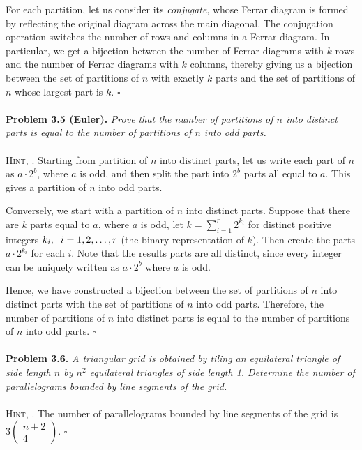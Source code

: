 \documentclass[a4paper,oneside]{article}
\numberwithin{equation}{section}
\begin{document}
For each partition, let us consider its \textit{conjugate}, whose Ferrar diagram is formed by reflecting the original diagram across the main diagonal. The conjugation operation switches the number of rows and columns in a Ferrar diagram. In particular, we get a bijection between the number of Ferrar diagrams with $k$ rows and the number of Ferrar diagrams with $k$ columns, thereby giving us a bijection between the set of partitions of $n$ with exactly $k$ parts and the set of partitions of $n$ whose largest part is $k$. \hfill $\square$\\
\\
\textbf{Problem 3.5 (Euler).} \textit{Prove that the number of partitions of $n$ into distinct parts is equal to the number of partitions of $n$ into odd parts.}\\
\\
\textsc{Hint, \cite{4}.} Starting from partition of $n$ into distinct parts, let us write each part of $n$ as $a\cdot 2^b$, where $a$ is odd, and then split the part into $2^b$ parts all equal to $a$. This gives a partition of $n$ into odd parts. 

Conversely, we start with a partition of $n$ into distinct parts. Suppose that there are $k$ parts equal to $a$, where $a$ is odd, let $k = \sum\limits_{i = 1}^r {{2^{{k_i}}}}$ for distinct positive integers $k_i,\hspace{0.2cm}i=1,2,\ldots,r$ (the binary representation of $k$). Then create the parts $a \cdot {2^{{k_i}}}$ for each $i$. Note that the results parts are all distinct, since every integer can be uniquely written as $a\cdot 2^b$ where $a$ is odd. 

Hence, we have constructed a bijection between the set of partitions of $n$ into distinct parts with the set of partitions of $n$ into odd parts. Therefore, the number of partitions of $n$ into distinct parts is equal to the number of partitions of $n$ into odd parts. \hfill $\square$\\
\\
\textbf{Problem 3.6.} \textit{A triangular grid is obtained by tiling an equilateral triangle of side length $n$ by $n^2$ equilateral triangles of side length 1. Determine the number of parallelograms bounded by line segments of the grid.}\\
\\
\textsc{Hint, \cite{4}.} The number of parallelograms bounded by line segments of the grid is $3\left( {\begin{array}{*{20}{c}}
{n + 2}\\
4
\end{array}} \right)$. \hfill $\square$
\end{document}
